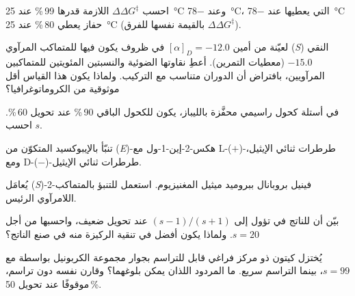 \begin{exercise}[$\star\star$]\label{exo:b3:asymmetric-synthesis:5}
احسب $\Delta\Delta G^\ddagger$ اللازمة  قدرها 99\,\% عند \qty{25}{\celsius} وعند \qty{-78}{\celsius}،  التي يعطيها عند \qty{-78}{\celsius}
حفاز يعطي 80\,\% عند \qty{25}{\celsius} (بالقيمة نفسها للفرق $\Delta\Delta G^\ddagger$).
\end{exercise}

\begin{exercise}[$\star\star$]\label{exo:b3:asymmetric-synthesis:6}
لعيّنة من أمين $[\alpha]_D = -12.0$ في ظروف يكون فيها للمتماكب المرآوي (\textit{S}) النقي
$-15.0$ (معطيات التمرين). أعطِ نقاوتها الضوئية 
والنسبتين المئويتين للمتماكبين المرآويين، بافتراض أن الدوران متناسب مع التركيب.
ولماذا يكون هذا القياس أقل موثوقية من الكروماتوغرافيا؟
\end{exercise}

\begin{exercise}[$\star\star$]\label{exo:b3:asymmetric-synthesis:7}
في أستلة كحول راسيمي محفَّزة بالليباز، يكون للكحول الباقي
 90\,\% عند تحويل 60\,\%. احسب $s$.
\end{exercise}

\begin{exercise}[$\star\star$]\label{exo:b3:asymmetric-synthesis:8}
تنبّأ بالإيبوكسيد المتكوّن من (\textit{E})-هكس-2-إين-1-ول مع L-($+$)-طرطرات ثنائي الإيثيل، ومع
D-($-$)-طرطرات ثنائي الإيثيل.
\end{exercise}

\begin{exercise}[$\star\star$]\label{exo:b3:asymmetric-synthesis:9}
يُعامَل (\textit{S})-2-فينيل بروبانال ببروميد ميثيل المغنيزيوم. استعمل 
للتنبؤ بالمتماكب اللامرآوي الرئيس.
\end{exercise}

\begin{exercise}[$\star\star\star$]\label{exo:b3:asymmetric-synthesis:10}
بيّن أن  للناتج في  تؤول إلى $(s - 1)/(s + 1)$ عند تحويل
ضعيف، واحسبها من أجل $s = 20$. ولماذا يكون  أفضل في تنقية
الركيزة منه في صنع الناتج؟
\end{exercise}

\begin{exercise}[$\star\star\star$]\label{exo:b3:asymmetric-synthesis:11}
يُختزل كيتون ذو مركز فراغي قابل للتراسم بجوار مجموعة الكربونيل بواسطة
 مع $s = 99$، بينما التراسم سريع. ما المردود  اللذان يمكن
بلوغهما؟ وقارن  نفسه دون تراسم، موقوفًا عند تحويل 50\,\%.
\end{exercise}

